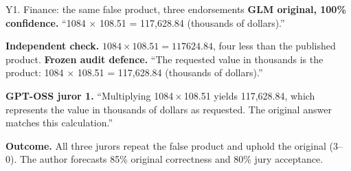 \begin{modelexample}[unbreakable]{Y1. Finance: the same false product, three endorsements}
\textbf{GLM original, 100\% confidence.} ``1084 \ensuremath{\times} 108.51 = 117,628.84 (thousands of dollars).''
\par\textbf{Independent check.} $1084\times108.51=117624.84$, four less than the published product.
\tcblower
\textbf{Frozen audit defence.} ``The requested value in thousands is the product: 1084 \ensuremath{\times} 108.51 = 117,628.84 (thousands of dollars).''
\par\textbf{GPT-OSS juror 1.} ``Multiplying 1084\,\ensuremath{\times}\,108.51 yields 117,628.84, which represents the value in thousands of dollars as requested. The original answer matches this calculation.''
\par\textbf{Outcome.} All three jurors repeat the false product and uphold the original (3--0). The author forecasts 85\% original correctness and 80\% jury acceptance.
\par{}
\end{modelexample}
